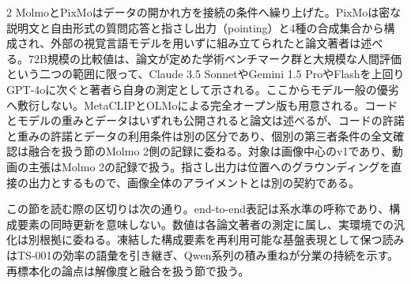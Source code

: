 \documentclass[lualatex,a4paper,10pt]{jlreq}
\begin{document}
\begin{multicols}{2}
\noindent MolmoとPixMoはデータの開かれ方を接続の条件へ繰り上げた。PixMoは密な説明文と自由形式の質問応答と指さし出力（pointing）と4種の合成集合から構成され、外部の視覚言語モデルを用いずに組み立てられたと論文著者は述べる。72B規模の比較値は、論文が定めた学術ベンチマーク群と大規模な人間評価という二つの範囲に限って、Claude 3.5 SonnetやGemini 1.5 ProやFlashを上回りGPT-4oに次ぐと著者ら自身の測定として示される。ここからモデル一般の優劣へ敷衍しない。MetaCLIPとOLMoによる完全オープン版も用意される。コードとモデルの重みとデータはいずれも公開されると論文は述べるが、コードの許諾と重みの許諾とデータの利用条件は別の区分であり、個別の第三者条件の全文確認は融合を扱う節のMolmo 2側の記録に委ねる。対象は画像中心のv1であり、動画の主張はMolmo 2の記録で扱う。指さし出力は位置へのグラウンディングを直接の出力とするもので、画像全体のアライメントとは別の契約である。\autocite{vmd063}\par\medskip
\end{multicols}
\begin{claimboundary}[本節の読解上の境界]
\noindent この節を読む際の区切りは次の通り。end-to-end表記は系水準の呼称であり、構成要素の同時更新を意味しない。数値は各論文著者の測定に属し、実環境での汎化は別根拠に委ねる。凍結した構成要素を再利用可能な基盤表現として保つ読みはTS-001の効率の語彙を引き継ぎ、Qwen系列の積み重ねが分業の持続を示す。再標本化の論点は解像度と融合を扱う節で扱う。\autocite{vmd058,vmd059,vmd060,vmd062,vmd057,vmd061,vmd063}\par
\end{claimboundary}

\Needspace{0.20\textheight}
\end{document}
